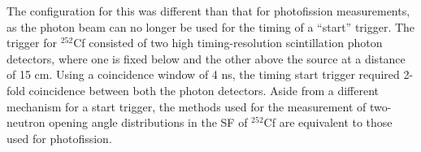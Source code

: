 The configuration for this was different than that for photofission measurements, as the photon beam can no longer be used for the timing of a ``start'' trigger.
The trigger for $^{252}$Cf consisted of two high timing-resolution scintillation photon detectors, where one is fixed below and the other above the source at a distance of 15 cm.
Using a coincidence window of 4 ns, the timing start trigger required 2-fold coincidence between both the photon detectors.
Aside from a different mechanism for a start trigger, the methods used for the measurement of two-neutron opening angle distributions in the SF of $^{252}$Cf are equivalent to those used for photofission.


